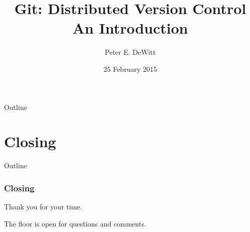 \ifuseblack
\else
\fi


\author{Peter E. DeWitt}
\title[Intro to Git]{Git: Distributed Version Control \\ {\small An
Introduction}}
\date{25 February 2015}



 
  \watermarkoff

  \begin{frame}[t,plain]
    \titlepage
  \end{frame}

  \begin{frame}[t]{Outline}
    \tableofcontents[hideallsubsections]
  \end{frame}

  \section{Closing}
  \begin{frame}[t]{Outline}
  \end{frame}

  \begin{frame}[t] 
    \frametitle{Closing}
    \begin{center}
    Thank you for your time.

    \vspace{1in}

    The floor is open for questions and comments.
    \end{center} 
  \end{frame}



